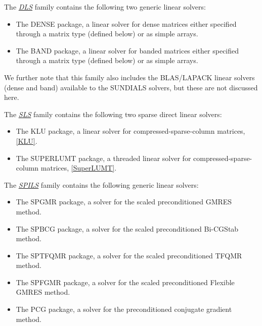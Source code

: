 \documentclass[letterpaper,10pt,english]{sphinxmanual}
\begin{document}
The {\hyperref[linear_solvers/DLS:linearsolvers-dls]{\emph{DLS}}} family contains the following two
generic linear solvers:
\begin{itemize}
\item {} 
The DENSE package, a linear solver for dense matrices either
specified through a matrix type (defined below) or as simple
arrays.

\item {} 
The BAND package, a linear solver for banded matrices either
specified through a matrix type (defined below) or as simple
arrays.

\end{itemize}

We further note that this family also includes the BLAS/LAPACK linear
solvers (dense and band) available to the SUNDIALS solvers, but these
are not discussed here.

The {\hyperref[linear_solvers/SLS:linearsolvers-sls]{\emph{SLS}}} family contains the following two
sparse direct linear solvers:
\begin{itemize}
\item {} 
The KLU package, a linear solver for compressed-sparse-column
matrices, {\hyperref[References:klu]{{[}KLU{]}}}.

\item {} 
The SUPERLUMT package, a threaded linear solver for
compressed-sparse-column matrices, {\hyperref[References:superlumt]{{[}SuperLUMT{]}}}.

\end{itemize}

The {\hyperref[linear_solvers/SPILS:linearsolvers-spils]{\emph{SPILS}}} family contains the following
generic linear solvers:
\begin{itemize}
\item {} 
The SPGMR package, a solver for the scaled preconditioned GMRES
method.

\item {} 
The SPBCG package, a solver for the scaled preconditioned Bi-CGStab
method.

\item {} 
The SPTFQMR package, a solver for the scaled preconditioned TFQMR
method.

\item {} 
The SPFGMR package, a solver for the scaled preconditioned Flexible
GMRES method.

\item {} 
The PCG package, a solver for the preconditioned conjugate gradient
method.

\end{itemize}
\end{document}
